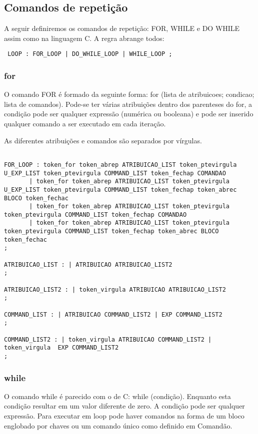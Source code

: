 \documentclass[a4paper,10pt]{article}
\begin{document}
\subsection{Comandos de repetição}
A seguir definiremos os comandos de repetição: FOR, WHILE e DO WHILE assim como na linguagem C. A regra abrange todos:
\begin{verbatim}
 LOOP : FOR_LOOP | DO_WHILE_LOOP | WHILE_LOOP ;
\end{verbatim}

\subsubsection{for}

O comando FOR é formado da seguinte forma: for (lista de atribuicoes; condicao; lista de comandos). Pode-se ter várias atribuições dentro dos parenteses do for,
a condição pode ser qualquer expressão (numérica ou booleana) e pode ser inserido qualquer comando a ser executado em cada iteração.

As diferentes atribuições e comandos são separados por vírgulas.

\begin{verbatim}

FOR_LOOP : token_for token_abrep ATRIBUICAO_LIST token_ptevirgula U_EXP_LIST token_ptevirgula COMMAND_LIST token_fechap COMANDAO
	   | token_for token_abrep ATRIBUICAO_LIST token_ptevirgula U_EXP_LIST token_ptevirgula COMMAND_LIST token_fechap token_abrec BLOCO token_fechac
	   | token_for token_abrep ATRIBUICAO_LIST token_ptevirgula token_ptevirgula COMMAND_LIST token_fechap COMANDAO
	   | token_for token_abrep ATRIBUICAO_LIST token_ptevirgula token_ptevirgula COMMAND_LIST token_fechap token_abrec BLOCO token_fechac
;

ATRIBUICAO_LIST : | ATRIBUICAO ATRIBUICAO_LIST2
;

ATRIBUICAO_LIST2 : | token_virgula ATRIBUICAO ATRIBUICAO_LIST2
;

COMMAND_LIST : | ATRIBUICAO COMMAND_LIST2 | EXP COMMAND_LIST2
;

COMMAND_LIST2 : | token_virgula ATRIBUICAO COMMAND_LIST2 | token_virgula  EXP COMMAND_LIST2
;

\end{verbatim}

\subsubsection{while}

O comando while é parecido com o de C: while (condição). Enquanto esta condição resultar em um valor diferente de zero. A condição pode ser qualquer expressão.
Para executar em loop pode haver comandos na forma de um bloco englobado por chaves ou um comando único como definido em Comandão.
\end{document}

